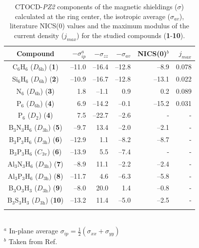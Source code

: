 \begin{table}[ht]
\caption{CTOCD-\textit{PZ2} components of the magnetic shieldings ($\sigma$) calculated at the ring center, the isotropic average ($\sigma_{av}$), literature NICS(0) values and the maximum modulus of the current density ($j_{max}$) for the studied compounds (\textbf{1}-\textbf{10}).}
\begin{center}
\begin{tabular}{ c rrr rr }
\hline
\textbf{Compound} &$-\sigma_{ip}^a$ & $-\sigma_{zz}$ & $-\sigma_{av}$ & NICS(0)$^b$ & $j_{max}$\\
\hline
C$_6$H$_6$ ($D_\mathrm{6h}$) (\textbf{1})& --11.0 & --16.4 & --12.8 &   --8.9 & 0.078\\
Si$_6$H$_6$ ($D_\mathrm{6h}$) (\textbf{2})& --10.9 & --16.7 & --12.8 &  --13.1 & 0.022\\
N$_6$ ($D_\mathrm{6h}$) (\textbf{3})& 1.8 &  --1.1 &   0.9 &   0.2 & 0.089\\
P$_6$ ($D_\mathrm{6h}$) (\textbf{4})& 6.9 & --14.2 &  --0.1 & --15.2 & 0.031\\
P$_6$ ($D_\mathrm{2}$) (\textbf{4})& 7.5 & --22.7 & --2.6 & - & - \\
B$_3$N$_3$H$_6$ ($D_\mathrm{3h}$) (\textbf{5})& --9.7 &  13.4 &  --2.0 &   --2.1 & -\\
B$_3$P$_3$H$_6$ ($D_\mathrm{3h}$) (\textbf{6})& --12.9 &   1.1 &  --8.2 &  --8.7 & -\\
B$_3$P$_3$H$_6$ ($C_\mathrm{3v}$) (\textbf{6})& --13.9 &   5.5 &  --7.4 &  - & -\\
Al$_3$N$_3$H$_6$ ($D_\mathrm{3h}$) (\textbf{7})& --8.9 &  11.1 &  --2.2 &   --2.4 & -\\
Al$_3$P$_3$H$_6$ ($D_\mathrm{3h}$) (\textbf{8})& --11.7 &   4.6 &  --6.3 &  --5.8 & -\\
B$_3$O$_3$H$_3$ ($D_\mathrm{3h}$) (\textbf{9})&  --8.0 &  20.0 &   1.4 &  --0.8 & -\\
B$_3$S$_3$H$_3$ ($D_\mathrm{3h}$) (\textbf{10})& --13.2 &  11.4 &  --5.0 &  --2.5 & -\\
\\
\end{tabular}
\\
\flushleft
$^a$ In-plane average $\sigma_{ip}=\frac{1}{2}(\sigma_{xx}+\sigma_{yy})$\\
$^b$ Taken from Ref.  \cite{schleyer1}\\
\label{ch6.table4}
\end{center}
\end{table}


